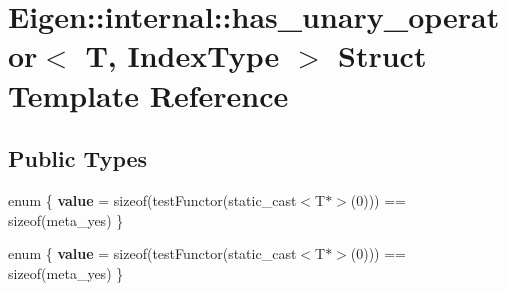 \hypertarget{struct_eigen_1_1internal_1_1has__unary__operator}{}\section{Eigen\+:\+:internal\+:\+:has\+\_\+unary\+\_\+operator$<$ T, Index\+Type $>$ Struct Template Reference}
\label{struct_eigen_1_1internal_1_1has__unary__operator}
\subsection*{Public Types}
\begin{DoxyCompactItemize}
\item 
\mbox{\label{struct_eigen_1_1internal_1_1has__unary__operator_a987346688d496a5ca0170be2edabf6ba}} 
enum \{ {\bfseries value} = sizeof(test\+Functor(static\+\_\+cast$<$T$\ast$$>$(0))) == sizeof(meta\+\_\+yes)
 \}
\item 
\mbox{\label{struct_eigen_1_1internal_1_1has__unary__operator_ac600a6d27007457a3eee17ae1ef3e257}} 
enum \{ {\bfseries value} = sizeof(test\+Functor(static\+\_\+cast$<$T$\ast$$>$(0))) == sizeof(meta\+\_\+yes)
 \}
\end{DoxyCompactItemize}
